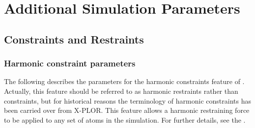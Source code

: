 
\section{Additional Simulation Parameters}
\label{section:add}

\subsection{Constraints and Restraints}
\label{section:config_add}

\subsubsection{Harmonic constraint parameters}

The following describes the parameters for the 
harmonic constraints feature of \NAMD.  Actually, this feature 
should be referred to as harmonic restraints rather than 
constraints, but for historical reasons the terminology of 
harmonic constraints has been carried over from X-PLOR.  
This feature allows a harmonic restraining force to be applied 
to any set of atoms in the simulation.  For further details, 
see the \PG.  

